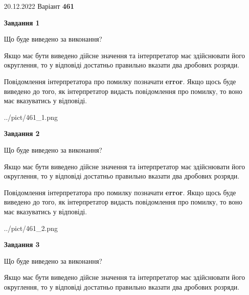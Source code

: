 \documentclass[12pt, ukrainian]{article}
\begin{document}
{20.12.2022 Варіант \No \textbf { 461 }\par}
{
\begin {Large}

{\begin {center}\textbf{Завдання 1}\end {center}}\par
Що буде виведено за виконання? \par

Якщо має бути виведено дійсне значення та інтерпретатор має здійснювати його округлення, 
то у відповіді достатньо правильно вказати два дробових розряди.

Повідомлення інтерпретатора про помилку позначати \textbf{error}.
Якщо щось буде виведено до того, як інтерпретатор видасть повідомлення про помилку, 
то воно має вказуватись у відповіді. \par

\begin{center}
	{../pict/461_1.png}
\end{center}
\newpage

{\begin {center}\textbf{Завдання 2}\end {center}}\par
Що буде виведено за виконання? \par

Якщо має бути виведено дійсне значення та інтерпретатор має здійснювати його округлення, 
то у відповіді достатньо правильно вказати два дробових розряди.

Повідомлення інтерпретатора про помилку позначати \textbf{error}.
Якщо щось буде виведено до того, як інтерпретатор видасть повідомлення про помилку, 
то воно має вказуватись у відповіді. \par

\begin{center}
	{../pict/461_2.png}
\end{center}
\newpage

{\begin {center}\textbf{Завдання 3}\end {center}}\par
Що буде виведено за виконання? \par

Якщо має бути виведено дійсне значення та інтерпретатор має здійснювати його округлення, 
то у відповіді достатньо правильно вказати два дробових розряди.


\end{Large}}
\end{document}
